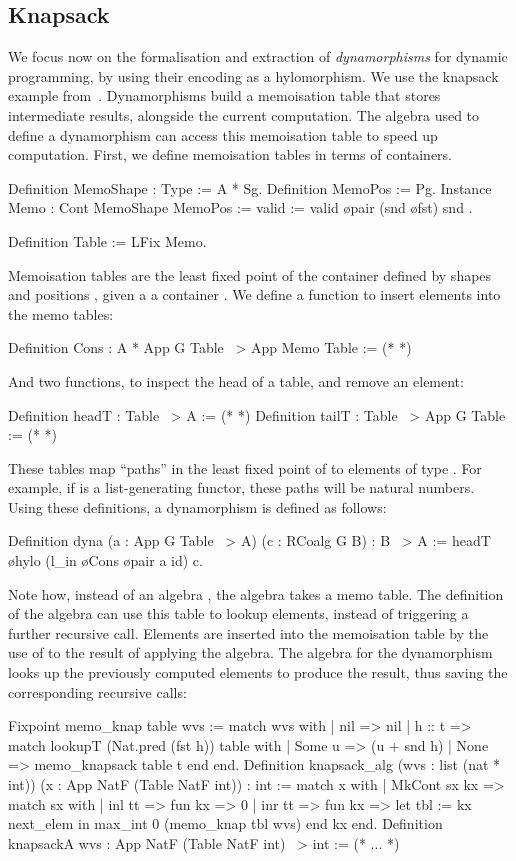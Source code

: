 \documentclass[a4paper,anonymous, UKenglish,cleveref, autoref, thm-restate]{lipics-v2021}
\begin{document}
\subsection{Knapsack}\label{sec:knap}
We focus now on the formalisation and extraction of \emph{dynamorphisms} for
dynamic programming, by using their encoding as a hylomorphism. We use the
knapsack example from~\cite{HinzeWG15}. Dynamorphisms build a memoisation table
that stores intermediate results, alongside the current computation. The
algebra used to define a dynamorphism can access this memoisation table to
speed up computation.  First, we define memoisation tables in terms of
containers. 
\begin{coqcode}
Definition MemoShape : Type := A * Sg.
Definition MemoPos := Pg.
Instance Memo : Cont MemoShape MemoPos
  := { valid := valid \o pair (snd \o fst) snd }.

Definition Table := LFix Memo.
\end{coqcode}
Memoisation tables are the least fixed point of the container defined by shapes
 and positions , given a a container .
We define a function to insert elements into the memo tables:
\begin{coqcode}
Definition Cons : A * App G Table ~> App Memo Table := (* *)
\end{coqcode}
And two functions, to inspect the head of a table, and remove an
element:
\begin{coqcode}
Definition headT : Table ~> A := (* *)
Definition tailT : Table ~> App G Table := (* *)
\end{coqcode}
These tables map ``paths'' in the least fixed point of  to elements
of type . For example, if  is a list-generating functor, these
paths will be natural numbers. 
Using these definitions, a dynamorphism is defined as follows:
\begin{coqcode}
Definition dyna (a : App G Table ~> A) (c : RCoalg G B) : B ~> A
  := headT \o hylo (l_in \o Cons \o pair a id) c.
\end{coqcode}
Note how, instead of an algebra , the algebra takes a
memo table. The definition of the algebra can use this table to lookup
elements, instead of triggering a further recursive call. Elements are inserted
into the memoisation table by the use of  to the result of applying
the algebra. The algebra for the dynamorphism looks up the previously computed
elements to produce the result, thus saving the corresponding recursive calls:
\begin{coqcode}
Fixpoint memo_knap table wvs :=
  match wvs with | nil => nil | h :: t =>
      match lookupT (Nat.pred (fst h)) table with
      | Some u => (u + snd h)%
      | None => memo_knapsack table t
      end
  end.
Definition knapsack_alg (wvs : list (nat * int))
  (x : App NatF (Table NatF int)) : int :=
  match x with | MkCont sx kx => match sx with
  | inl tt => fun kx => 0%
  | inr tt => fun kx => let tbl := kx next_elem in max_int 0 (memo_knap tbl wvs)
  end kx end.
Definition knapsackA wvs : App NatF (Table NatF int) ~> int :=  (* ... *)
\end{coqcode}
\end{document}
